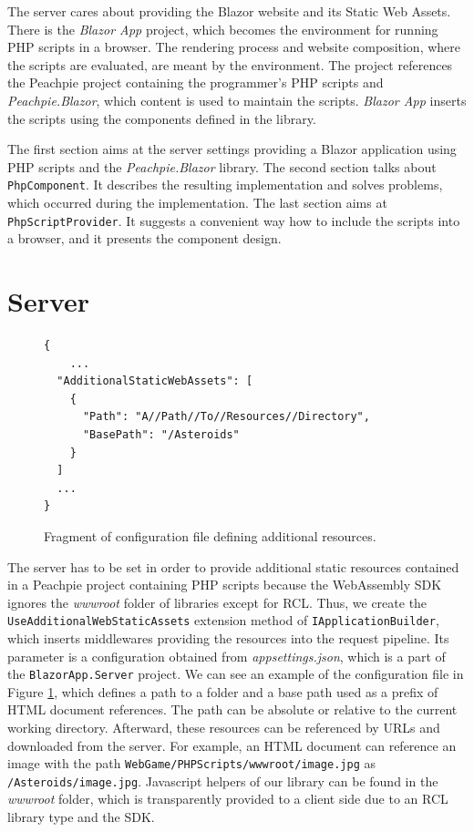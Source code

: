 The server cares about providing the Blazor website and its Static Web Assets.
There is the \textit{Blazor App} project, which becomes the environment for running PHP scripts in a browser.
The rendering process and website composition, where the scripts are evaluated, are meant by the environment.
The project references the Peachpie project containing the programmer's PHP scripts and \textit{Peachpie.Blazor}, which content is used to maintain the scripts.
\textit{Blazor App} inserts the scripts using the components defined in the library.
\par
The first section aims at the server settings providing a Blazor application using PHP scripts and the \textit{Peachpie.Blazor} library.
The second section talks about \texttt{PhpComponent}.
It describes the resulting implementation and solves problems, which occurred during the implementation.
The last section aims at \texttt{PhpScriptProvider}.
It suggests a convenient way how to include the scripts into a browser, and it presents the component design.

\section{Server}

\begin{figure}[b!]
\begin{lstlisting}
{
	...
  "AdditionalStaticWebAssets": [
    {
      "Path": "A//Path//To//Resources//Directory",
      "BasePath": "/Asteroids"
    }
  ]
  ...
}

\end{lstlisting}
\caption{Fragment of configuration file defining additional resources.}
\label{img19:settings}
\end{figure}
\par
The server has to be set in order to provide additional static resources contained in a Peachpie project containing PHP scripts because the WebAssembly SDK ignores the \textit{wwwroot} folder of libraries except for RCL.
Thus, we create the \texttt{UseAdditionalWebStaticAssets} extension method of \texttt{IApplicationBuilder}, which inserts middlewares providing the resources into the request pipeline.
Its parameter is a configuration obtained from \textit{appsettings.json}, which is a part of the \texttt{BlazorApp.Server} project.
We can see an example of the configuration file in Figure \ref{img19:settings}, which defines a path to a folder and a base path used as a prefix of HTML document references.
The path can be absolute or relative to the current working directory.
Afterward, these resources can be referenced by URLs and downloaded from the server.
For example, an HTML document can reference an image with the path \texttt{WebGame/PHPScripts/wwwroot/image.jpg} as \texttt{/Asteroids/image.jpg}.
Javascript helpers of our library can be found in the \textit{wwwroot} folder, which is transparently provided to a client side due to an RCL library type and the SDK.

